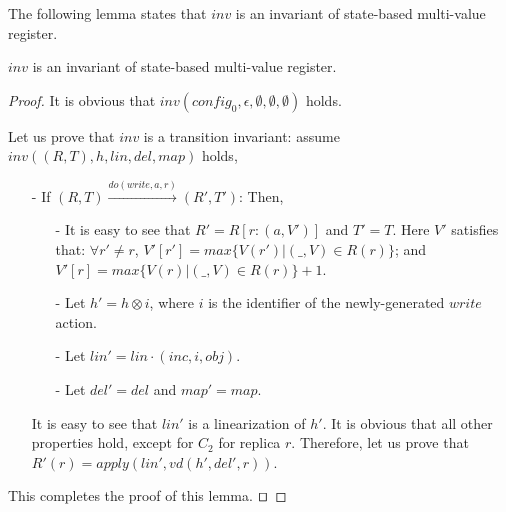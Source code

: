 The following lemma states that $\mathit{inv}$ is an invariant of state-based multi-value register.

\begin{lemma}
\label{lemma:inv is an invariant of state-based CRDT for state-based multi-value register}
$\mathit{inv}$ is an invariant of state-based multi-value register.
\end{lemma}

\begin {proof}

It is obvious that $\mathit{inv}(\mathit{config}_0,\epsilon,\emptyset,\emptyset,\emptyset)$ holds.

Let us prove that $\mathit{inv}$ is a transition invariant: assume $\mathit{inv}((R,T),h,\mathit{lin},\mathit{del},\mathit{map})$ holds,

\begin{itemize}
\setlength{\itemsep}{0.5pt}
\item[-] If $(R,T) {\xrightarrow{\mathit{do}(\mathit{write},a,r)}} (R',T')$: Then,

    \begin{itemize}
    \setlength{\itemsep}{0.5pt}
    \item[-] It is easy to see that $R' = R[ r: ( a,V' ) ]$ and $T' = T$. Here $V'$ satisfies that: $\forall r' \neq r$, $V'[r'] = \mathit{max}\{ V(r') \vert (\_,V) \in R(r) \}$; and $V'[r] = \mathit{max}\{ V(r) \vert (\_,V) \in R(r) \} +1$. 

    \item[-] Let $h' = h \otimes i$, where $i$ is the identifier of the newly-generated $\mathit{write}$ action.

    \item[-] Let $\mathit{lin}' = \mathit{lin} \cdot (\mathit{inc},i,\mathit{obj})$.

    \item[-] Let $\mathit{del}' = \mathit{del}$ and $\mathit{map}' = \mathit{map}$.
    \end{itemize}

    It is easy to see that $\mathit{lin}'$ is a linearization of $h'$. It is obvious that all other properties hold, except for $C_2$ for replica $r$. Therefore, let us prove that $R'(r) = \mathit{apply}(\mathit{lin}',\mathit{vd}(h',\mathit{del}',r))$. 
\end{itemize}

This completes the proof of this lemma. $\qed$
\end {proof}


